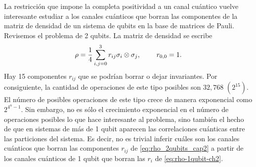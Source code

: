 
La restricción que impone la completa positividad a un canal cuántico 
vuelve interesante estudiar a los canales cuánticos que borran las componentes 
de la matriz de densidad de un sistema de qubits en la base de matrices 
de Pauli. Revisemos el problema de 2 qubits. La matriz de densidad
se escribe
\begin{align}\label{eq:rho_2qubits_cap2}
\rho = \frac{1}{4}\sum_{i,j=0}^3r_{ij}\sigma_i\otimes\sigma_j, 
\hspace{.8cm} r_{0,0}=1.
\end{align}
Hay 15 componentes $r_{ij}$ que se podrían borrar o dejar invariantes. 
Por consiguiente, la cantidad de operaciones de este tipo posibles son 
$32,768$ $(2^{15})$. El número de posibles operaciones de este tipo 
crece de manera exponencial como $2^{4^n-1}$. Sin embargo, no es 
sólo el crecimiento exponencial en el número de operaciones posibles 
lo que hace interesante al problema, sino también el hecho de que en 
sistemas de más de 1 qubit aparecen las correlaciones cuánticas entre 
las particiones del sistema. Es decir, no es trivial inferir cuáles son los 
canales cuánticos que borran las componentes $r_{ij}$ de 
\eqref{eq:rho_2qubits_cap2} a partir de los canales cuánticos 
de 1 qubit que borran las $r_i$ de \eqref{eq:rho-1qubit-ch2}.


